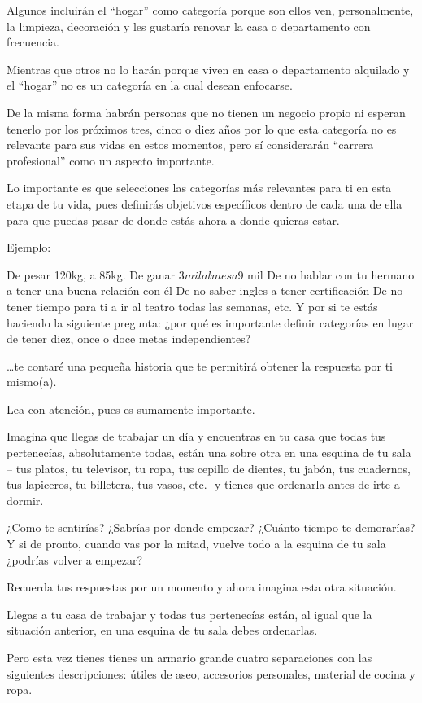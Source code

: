 \documentclass[12pt]{book}
\begin{document}
Algunos incluirán el “hogar” como categoría porque son ellos ven, personalmente, la limpieza, decoración y les gustaría renovar la casa o departamento con frecuencia.

Mientras que otros no lo harán porque viven en casa o departamento alquilado y el “hogar” no es un categoría en la cual desean enfocarse.

De la misma forma habrán personas que no tienen un negocio propio ni esperan tenerlo por los próximos tres, cinco o diez años por lo que esta categoría no es relevante para sus vidas en estos momentos, pero sí considerarán “carrera profesional” como un aspecto importante.

Lo importante es que selecciones las categorías más relevantes para ti en esta etapa de tu vida, pues definirás objetivos específicos dentro de cada una de ella para que puedas pasar de donde estás ahora a donde quieras estar.

Ejemplo:

De pesar 120kg, a 85kg.
De ganar $3 mil al mes a $9 mil
De no hablar con tu hermano a tener una buena relación con él
De no saber ingles a tener certificación
De no tener tiempo para ti a ir al teatro todas las semanas, etc.
Y por si te estás haciendo la siguiente pregunta: ¿por qué es importante definir categorías en lugar de tener diez, once o doce metas independientes?

…te contaré una pequeña historia que te permitirá obtener la respuesta por ti mismo(a).

Lea con atención, pues es sumamente importante.

Imagina que llegas de trabajar un día y encuentras en tu casa que todas tus pertenecías, absolutamente todas, están una sobre otra en una esquina de tu sala – tus platos, tu televisor, tu ropa, tus cepillo de dientes, tu jabón, tus cuadernos, tus lapiceros, tu billetera, tus vasos, etc.- y tienes que ordenarla antes de irte a dormir.

¿Como te sentirías? ¿Sabrías por donde empezar? ¿Cuánto tiempo te demorarías? Y si de pronto, cuando vas por la mitad, vuelve todo a la esquina de tu sala ¿podrías volver a empezar?

Recuerda tus respuestas por un momento y ahora imagina esta otra situación.

Llegas a tu casa de trabajar y todas tus pertenecías están, al igual que la situación anterior, en una esquina de tu sala debes ordenarlas.

Pero esta vez tienes tienes un armario grande cuatro separaciones con las siguientes descripciones: útiles de aseo, accesorios personales, material de cocina y ropa.
\end{document}
